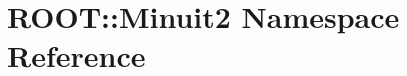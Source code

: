 \hypertarget{namespaceROOT_1_1Minuit2}{
\section{ROOT::Minuit2 Namespace Reference}
\label{namespaceROOT_1_1Minuit2}
}
